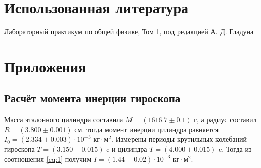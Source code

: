 \documentclass[12pt]{article}
\begin{document}
\section{Использованная литература}
\begin{thebibliography}{9}
    Лабораторный практикум по общей физике, Том 1, под редакцией А. Д. Гладуна
\end{thebibliography}

\section{Приложения}
\subsection{Расчёт момента инерции гироскопа} \label{app_1}
Масса эталонного цилиндра составила $M = (1616.7 \pm 0.1) \textrm{ г}$, а радиус составил $R = (3.800 \pm 0.001) \textrm{ см}$.
тогда момент инерции цилиндра равняется $I_0 = (2.334 \pm 0.003) \cdot 10^{-3} \textrm{ кг} \cdot \textrm{м}^2$. Измерены периоды крутильных колебаний 
гироскопа $T = (3.150 \pm 0.015)$ c и цилиндра $T = (4.000 \pm 0.015)$ c. Тогда из соотношения \ref{eq:1} получим 
$I = (1.44 \pm 0.02) \cdot 10^{-3} \textrm{ кг} \cdot \textrm{м}^2$.
\end{document}
